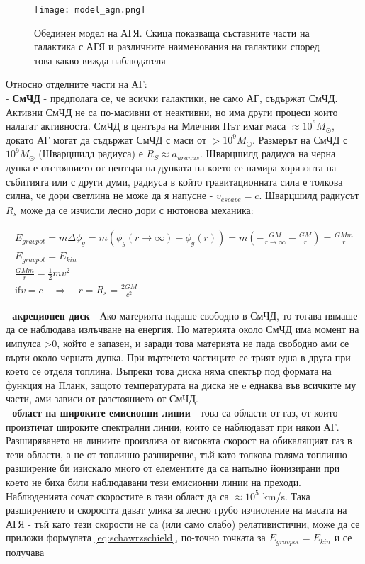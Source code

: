 \documentclass[a4paper,12pt]{article}
\begin{document}
\begin{figure}[H] %
\centering
\texttt{[image: model\_agn.png]}
\caption{Обединен модел на АГЯ. Скица показваща съставните части на галактика с АГЯ и различните наименования на галактики според това какво вижда наблюдателя}
\label{fig:model_agn}
\end{figure}

Относно отделните части на АГ:\\

- \textbf{СмЧД} - предполага се, че всички галактики, не само АГ, съдържат СмЧД. Активни СмЧД не са по-масивни от неактивни, но има други процеси които налагат активноста. СмЧД в центъра на Млечния Път имат маса $\approx 10^6 M_\odot$, докато АГ могат да съдържат СмЧД с маси от $> 10^9 M_\odot$. Размерът на СмЧД с $10^9 M_\odot$ (Шварцшилд радиуса) е $R_{S} \approx a_{uranus}$. Шварцшилд радиуса на черна дупка е отстоянието от центъра на дупката на което се намира хоризонта на събитията или с други думи, радиуса в който гравитационната сила е толкова силна, че дори светлина не може да я напусне - $v_{escape} = c$. Шварцшилд радиусът $R_s$ може да се изчисли лесно дори с нютонова механика:

\begin{gather}
E_{gravpot}=m\Delta \phi_g = m(\phi_{g}(r\rightarrow \infty) - \phi_{g}(r)) = m(-\frac{GM}{r\rightarrow \infty} - \frac{GM}{r}) = \frac{GMm}{r} \\
E_{gravpot}=E_{kin}\\
\frac{GMm}{r} = \frac{1}{2}m v^2\\
\mathrm{if} v=c \quad \Rightarrow  \quad r=R_s=\frac{2GM}{c^2}
\label{eq:schawrzschield}
\end{gather}

- \textbf{акреционен диск} - Ако материята падаше свободно в СмЧД, то тогава нямаше да се наблюдава излъчване на енергия. Но материята около СмЧД има момент на импулса >0, който е запазен, и заради това материята не пада свободно ами се върти около черната дупка. При въртенето частиците се трият една в друга при което се отделя топлина. Въпреки това диска няма спектър под формата на функция на Планк, защото температурата на диска не e еднаква във всичките му части, ами зависи от разстоянието от СмЧД.\\

- \textbf{област на широките емисионни линии} - това са области от газ, от които произтичат широките спектрални линии, които се наблюдават при някои АГ. Разширяването на линиите произлиза от високата скорост на обикалящият газ в тези области, а не от топлинно разширение, тъй като толкова голяма топлинно разширение би изискало много от елементите да са напълно йонизирани при което не биха били наблюдавани тези емисионни линии на преходи. Наблюденията сочат скоростите в тази област да са $\approx 10^5$ km/s. Така разширението и скоростта дават улика за лесно грубо изчисление на масата на АГЯ - тъй като тези скорости не са (или само слабо) релативистични, може да се приложи формулата \ref{eq:schawrzschield}, по-точно точката за $E_{gravpot}=E_{kin}$ и се получава\\
\end{document}
